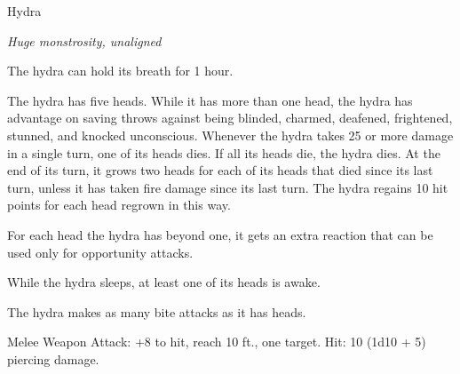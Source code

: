 \begin{monsterbox}{Hydra}
\begin{hangingpar}
\textit{Huge monstrosity, unaligned}
\end{hangingpar}
\dndline%
\basics[%
armorclass = 15,
hitpoints = 15d12 + 75,
speed = {30 ft., swim 30 ft.}
]
\dndline%
\stats[%
STR = \stat{20},
DEX = \stat{12},
CON = \stat{20},
INT = \stat{2},
WIS = \stat{10},
CHA = \stat{7}
]
\dndline%
\details[%
skills={Perception +6, },
damageimmunities={},
savingthrows={},
conditionimmunities={},
damageresistances={},
damagevulnerabilities={},
senses={darkvision 60 ft., passive Perception 16},
challenge=8
]
\dndline%
\begin{monsteraction}
The hydra can hold its breath for 1 hour.
\end{monsteraction}
\begin{monsteraction}
The hydra has five heads. While it has more than one head, the hydra has advantage on saving throws against being blinded, charmed, deafened, frightened, stunned, and knocked unconscious.
Whenever the hydra takes 25 or more damage in a single turn, one of its heads dies. If all its heads die, the hydra dies.
At the end of its turn, it grows two heads for each of its heads that died since its last turn, unless it has taken fire damage since its last turn. The hydra regains 10 hit points for each head regrown in this way.
\end{monsteraction}
\begin{monsteraction}
For each head the hydra has beyond one, it gets an extra reaction that can be used only for opportunity attacks.
\end{monsteraction}
\begin{monsteraction}[Wakeful]
While the hydra sleeps, at least one of its heads is awake.
\end{monsteraction}
\begin{monsteraction}[Multiattack]
The hydra makes as many bite attacks as it has heads.
\end{monsteraction}
\begin{monsteraction}[Bite]
Melee Weapon Attack: +8 to hit, reach 10 ft., one target. Hit: 10 (1d10 + 5) piercing damage.
\end{monsteraction}
\end{monsterbox}